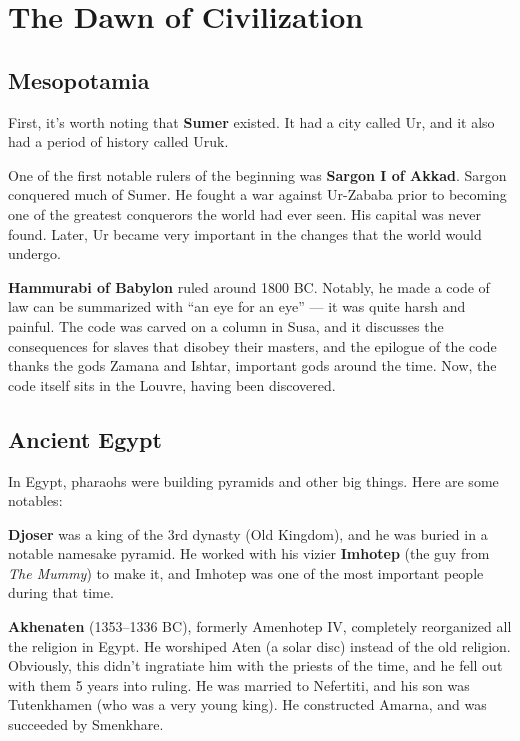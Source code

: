 \chapter{The Dawn of Civilization}

\section{Mesopotamia}

First, it's worth noting that \textbf{Sumer} existed.
It had a city called Ur, and it also had a period of history called Uruk.

One of the first notable rulers of the beginning was \textbf{Sargon I of Akkad}.
Sargon conquered much of Sumer.
He fought a war against Ur-Zababa prior to becoming one of the greatest conquerors the world had ever seen.
His capital was never found.
Later, Ur became very important in the changes that the world would undergo.

\textbf{Hammurabi of Babylon} ruled around 1800 BC\@.
Notably, he made a code of law can be summarized with ``an eye for an eye'' --- it was quite harsh and painful.
The code was carved on a column in Susa,
and it discusses the consequences for slaves that disobey their masters,
and the epilogue of the code thanks the gods Zamana and Ishtar, important gods around the time.
Now, the code itself sits in the Louvre, having been discovered.

\section{Ancient Egypt}

In Egypt, pharaohs were building pyramids and other big things. Here are some notables:

\textbf{Djoser} was a king of the 3rd dynasty (Old Kingdom),
and he was buried in a notable namesake pyramid.
He worked with his vizier \textbf{Imhotep} (the guy from \textit{The Mummy})
to make it, and Imhotep was one of the most important people during that time.

\textbf{Akhenaten} (1353--1336 BC), formerly Amenhotep IV, completely reorganized all the religion in Egypt.
He worshiped Aten (a solar disc) instead of the old religion.
Obviously, this didn't ingratiate him with the priests of the time, and he fell out with them 5 years into ruling.
He was married to Nefertiti, and his son was Tutenkhamen (who was a very young king).
He constructed Amarna, and was succeeded by Smenkhare.

